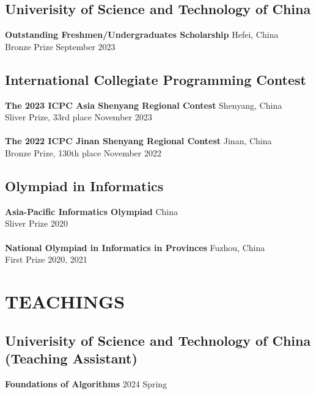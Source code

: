 \documentclass[a4paper,9pt]{extarticle}
\begin{document}
\subsection*{Univerisity of Science and Technology of China}
\textbf{Outstanding Freshmen/Undergraduates Scholarship}  \hfill Hefei, China\\ 
Bronze Prize \hfill September 2023\\

\subsection*{International Collegiate Programming Contest}
\textbf{The 2023 ICPC Asia Shenyang Regional Contest}  \hfill Shenyang, China\\ 
Sliver Prize, 33rd place \hfill November 2023\\ \\
\textbf{The 2022 ICPC Jinan Shenyang Regional Contest}  \hfill Jinan, China\\ 
Bronze Prize, 130th place \hfill November 2022\\

\subsection*{Olympiad in Informatics}
\textbf{Asia-Pacific Informatics Olympiad}  \hfill China\\ 
Sliver Prize \hfill 2020\\ \\
\textbf{National Olympiad in Informatics in Provinces}  \hfill Fuzhou, China\\ 
First Prize \hfill 2020, 2021\\

\section*{TEACHINGS}
\subsection*{Univerisity of Science and Technology of China (Teaching Assistant)}
\textbf{Foundations of Algorithms}  \hfill 2024 Spring\\ %


\end{document}
